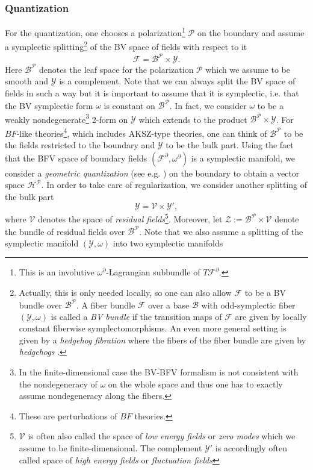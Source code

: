 \documentclass[11pt,colorinlistoftodos]{amsart}
\numberwithin{equation}{subsection}
\theoremstyle{plain}
\theoremstyle{definition}
\theoremstyle{remark}
\newcommand{\calY}{\mathcal{Y}}
\newcommand{\de}{\partial}
\newcommand{\calB}{\mathcal{B}}
\newcommand{\calH}{\mathcal{H}}
\newcommand{\calP}{\mathcal{P}}
\newcommand{\calF}{\mathcal{F}}
\newcommand{\calV}{\mathcal{V}}
\begin{document}
\subsubsection{Quantization} For the quantization, one chooses a polarization\footnote{This is an involutive $\omega^\de$-Lagrangian subbundle of $T\calF^\de$.} $\calP$ on the boundary and assume a symplectic splitting\footnote{Actually, this is only needed locally, so one can also allow $\calF$ to be a BV bundle over $\calB^\calP$. A fiber bundle $\calF$ over a base $\calB$ with odd-symplectic fiber $(\calY,\omega)$ is called a \emph{BV bundle} if the transition maps of $\calF$ are given by locally constant fiberwise symplectomorphisms. An even more general setting is given by a \emph{hedgehog fibration} where the fibers of the fiber bundle are given by \emph{hedgehogs} \cite{CMR2}.} of the BV space of fields with respect to it 
\begin{equation}
    \label{eq:splitting1}
    \calF=\calB^\calP\times \calY.
\end{equation}
Here $\calB^\calP$ denotes the leaf space for the polarization $\calP$ which we assume to be smooth and $\calY$ is a complement. Note that we can always split the BV space of fields in such a way but it is important to assume that it is symplectic, i.e. that the BV symplectic form $\omega$ is constant on $\calB^\calP$. In fact, we consider $\omega$ to be a weakly nondegenerate\footnote{In the finite-dimensional case the BV-BFV formalism is not consistent with the nondegeneracy of $\omega$ on the whole space and thus one has to exactly assume nondegeneracy along the fibers.} 2-form on $\calY$ which extends to the product $\calB^\calP\times\calY$.
For $BF$-like theories\footnote{These are perturbations of $BF$ theories.}, which includes AKSZ-type theories, one can think of $\calB^\calP$ to be the fields restricted to the boundary and $\calY$ to be the bulk part. Using the fact that the BFV space of boundary fields $(\calF^\de,\omega^\de)$ is a symplectic manifold, we consider a \emph{geometric quantization} (see e.g. \cite{Wood97,BatesWeinstein2012,Moshayedi2020_geomquant}) on the boundary to obtain a vector space $\calH^\calP$. In order to take care of regularization, we consider another splitting of the bulk part 
\begin{equation}
    \label{eq:splitting2}
    \calY=\calV\times \calY',
\end{equation}
where $\calV$ denotes the space of \emph{residual fields}\footnote{$\calV$ is often also called the space of \emph{low energy fields} or \emph{zero modes} which we assume to be finite-dimensional. The complement $\calY'$ is accordingly often called space of \emph{high energy fields} or \emph{fluctuation fields}}. Moreover, let $\mathcal{Z}:=\calB^\calP\times \calV$ denote the bundle of residual fields over $\calB^\calP$. Note that we also assume a splitting of the symplectic manifold $(\calY,\omega)$ into two symplectic manifolds 
\end{document}

